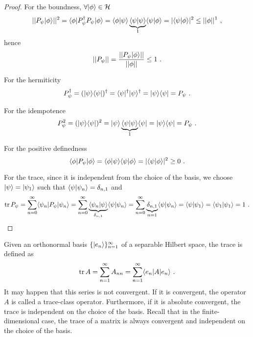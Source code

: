     \begin{proof}
        For the boundness, $\forall \vert\phi\rangle \in \mathcal H$
        \begin{equation*}
            ||P_\psi \vert\phi\rangle||^2 = \langle\phi\vert P_\psi^\dagger P_\psi \vert\phi\rangle = \langle\phi\vert\psi\rangle \underbrace{\langle\psi\vert\psi\rangle}_1 \langle\psi\vert\phi\rangle = |\langle\psi\vert\phi\rangle|^2 \leq ||\phi||^1 ~,
        \end{equation*}
        hence 
        \begin{equation*}
            ||P_\psi|| = \frac{||P_\psi \vert\phi\rangle||}{||\phi||} \leq 1 ~.
        \end{equation*}

        For the hermiticity
        \begin{equation*}
            P_\psi^\dagger = (\vert\psi\rangle \langle\psi\vert)^\dagger = \langle\psi\vert^\dagger \vert\psi\rangle^\dagger = \vert\psi\rangle \langle\psi\vert = P_\psi ~.
        \end{equation*}

        For the idempotence
        \begin{equation*}
            P_\psi^2 = (\vert\psi\rangle \langle\psi\vert)^2 = \vert\psi\rangle \underbrace{\langle\psi\vert\psi\rangle}_1 \langle\psi\vert = \vert\psi\rangle \langle\psi\vert = P_\psi ~.
        \end{equation*}

        For the positive definedness 
        \begin{equation*}
            \langle\phi\vert P_\psi \vert\phi\rangle = \langle\phi\vert\psi\rangle \langle\psi\vert\phi\rangle = |\langle\psi\vert\phi\rangle|^2 \geq 0 ~.
        \end{equation*}

        For the trace, since it is independent from the choice of the basis, we choose $\vert\psi\rangle = \vert\psi_1\rangle$ such that $\langle\psi\vert\psi_n\rangle = \delta_{n,1}$ and 
        \begin{equation*}
            \operatorname{tr} P_\psi = \sum_{n=0}^{\infty} \langle\psi_n\vert P_\psi \vert\psi_n\rangle = \sum_{n=0}^{\infty} \underbrace{\langle\psi_n\vert\psi\rangle}_{\delta_{n,1}} \langle\psi\vert\psi_n\rangle = \sum_{n=0}^{\infty} \underbrace{\delta_{n,1}}_{n=1} \langle\psi\vert\psi_n\rangle = \langle\psi\vert\psi_1\rangle = \langle\psi_1\vert\psi_1\rangle = 1 ~.
        \end{equation*}
    \end{proof}

    Given an orthonormal basis $\{\vert e_n\rangle\}_{n=1}^\infty$ of a separable Hilbert space, the trace is defined as 
    \begin{equation*}
        \operatorname{tr} A = \sum_{n=1}^\infty A_{nn} = \sum_{n=1}^\infty \langle e_n\vert A \vert e_n\rangle ~.
    \end{equation*}
    It may happen that this series is not convergent. If it is convergent, the operator $A$ is called a trace-class operator. Furthermore, if it is absolute convergent, the trace is independent on the choice of the basis. Recall that in the finite-dimensional case, the trace of a matrix is always convergent and independent on the choice of the basis.

